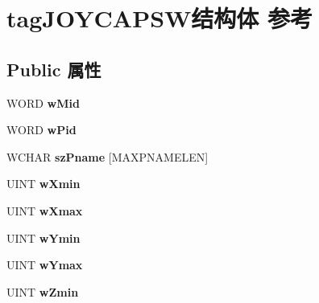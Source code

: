 \hypertarget{structtag_j_o_y_c_a_p_s_w}{}\section{tag\+J\+O\+Y\+C\+A\+P\+S\+W结构体 参考}
\label{structtag_j_o_y_c_a_p_s_w}
\subsection*{Public 属性}
\begin{DoxyCompactItemize}
\item 
\mbox{\label{structtag_j_o_y_c_a_p_s_w_a9b90df9d1573d7061a7e1ed7245902e8}} 
W\+O\+RD {\bfseries w\+Mid}
\item 
\mbox{\label{structtag_j_o_y_c_a_p_s_w_a5ff94438b2762deaf7335222a83209f7}} 
W\+O\+RD {\bfseries w\+Pid}
\item 
\mbox{\label{structtag_j_o_y_c_a_p_s_w_a3fa838c3185f2e4b09cb324ae6cac018}} 
W\+C\+H\+AR {\bfseries sz\+Pname} \mbox{[}M\+A\+X\+P\+N\+A\+M\+E\+L\+EN\mbox{]}
\item 
\mbox{\label{structtag_j_o_y_c_a_p_s_w_aa8b75b5cf8a0257af69927a2d7016a53}} 
U\+I\+NT {\bfseries w\+Xmin}
\item 
\mbox{\label{structtag_j_o_y_c_a_p_s_w_aa2332a4cffbc9a17895736f32f0c9c09}} 
U\+I\+NT {\bfseries w\+Xmax}
\item 
\mbox{\label{structtag_j_o_y_c_a_p_s_w_a5c8a69bcd55189129453816d5c3aa088}} 
U\+I\+NT {\bfseries w\+Ymin}
\item 
\mbox{\label{structtag_j_o_y_c_a_p_s_w_a03a362ddf5161fa77a49329abf853286}} 
U\+I\+NT {\bfseries w\+Ymax}
\item 
\mbox{\label{structtag_j_o_y_c_a_p_s_w_a746cea5fcb1737d42838e5591aa6cc8f}} 
U\+I\+NT {\bfseries w\+Zmin}
\item 
\mbox{\label{structtag_j_o_y_c_a_p_s_w_a0902cdb64788a04711a6231b47c7ae89}} 

\end{DoxyCompactItemize}
